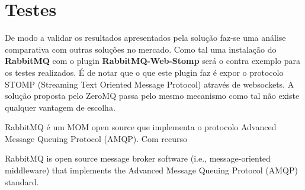 \section{Testes}

De modo a validar os resultados apresentados pela solução faz-se uma análise comparativa com outras soluções no mercado. Como tal uma instalação do \textbf{RabbitMQ} com o plugin \textbf{RabbitMQ-Web-Stomp} será o contra exemplo para os testes realizados. É de notar que o que este plugin faz é expor o protocolo STOMP (Streaming Text Oriented Message Protocol) através de websockets. A solução proposta pelo ZeroMQ passa pelo mesmo mecanismo como tal não existe qualquer vantagem de escolha.

RabbitMQ é um MOM open source que implementa o protocolo Advanced Message Queuing Protocol (AMQP). Com recurso 

RabbitMQ is open source message broker software (i.e., message-oriented middleware) 
that implements the Advanced Message Queuing Protocol (AMQP) standard.
